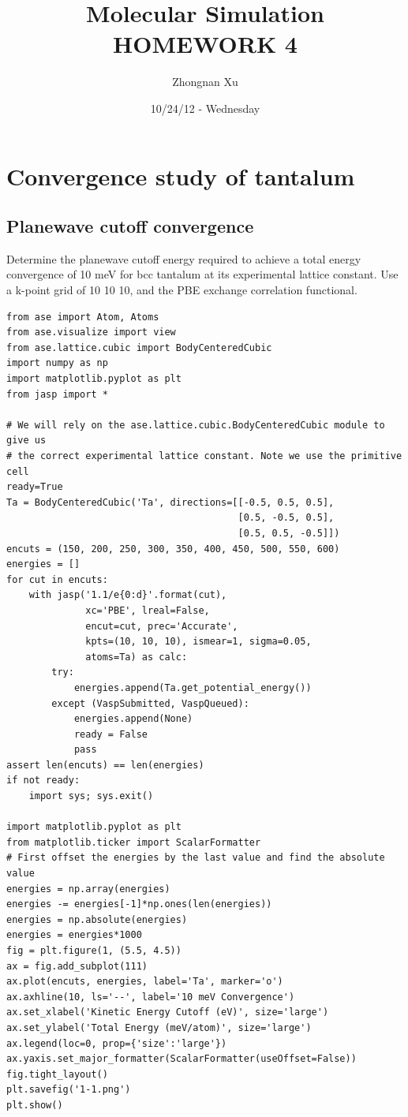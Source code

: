 \documentclass[11pt]{article}
\title{Molecular Simulation HOMEWORK 4}
\author{Zhongnan Xu}
\date{10/24/12 - Wednesday}
\begin{document}
\maketitle

\setcounter{tocdepth}{3}
\tableofcontents
\vspace*{1cm}


\section{Convergence study of tantalum}
\label{sec-1}
\subsection{Planewave cutoff convergence}
\label{sec-1-1}

Determine the planewave cutoff energy required to achieve a total energy convergence of 10 meV for bcc tantalum at its experimental lattice constant. Use a k-point grid of 10 \texttimes{} 10 \texttimes{} 10, and the PBE exchange correlation functional.


\begin{verbatim}
from ase import Atom, Atoms
from ase.visualize import view
from ase.lattice.cubic import BodyCenteredCubic
import numpy as np
import matplotlib.pyplot as plt
from jasp import *

# We will rely on the ase.lattice.cubic.BodyCenteredCubic module to give us
# the correct experimental lattice constant. Note we use the primitive cell
ready=True
Ta = BodyCenteredCubic('Ta', directions=[[-0.5, 0.5, 0.5],
                                         [0.5, -0.5, 0.5],
                                         [0.5, 0.5, -0.5]])
encuts = (150, 200, 250, 300, 350, 400, 450, 500, 550, 600)
energies = []
for cut in encuts:
    with jasp('1.1/e{0:d}'.format(cut),
              xc='PBE', lreal=False,
              encut=cut, prec='Accurate',
              kpts=(10, 10, 10), ismear=1, sigma=0.05,
              atoms=Ta) as calc:
        try:
            energies.append(Ta.get_potential_energy())
        except (VaspSubmitted, VaspQueued):
            energies.append(None)
            ready = False
            pass
assert len(encuts) == len(energies)
if not ready:
    import sys; sys.exit()

import matplotlib.pyplot as plt
from matplotlib.ticker import ScalarFormatter
# First offset the energies by the last value and find the absolute value
energies = np.array(energies)
energies -= energies[-1]*np.ones(len(energies))
energies = np.absolute(energies)
energies = energies*1000
fig = plt.figure(1, (5.5, 4.5))
ax = fig.add_subplot(111)
ax.plot(encuts, energies, label='Ta', marker='o')
ax.axhline(10, ls='--', label='10 meV Convergence')
ax.set_xlabel('Kinetic Energy Cutoff (eV)', size='large')
ax.set_ylabel('Total Energy (meV/atom)', size='large')
ax.legend(loc=0, prop={'size':'large'})
ax.yaxis.set_major_formatter(ScalarFormatter(useOffset=False))
fig.tight_layout()
plt.savefig('1-1.png')
plt.show()
\end{verbatim}
\end{document}
